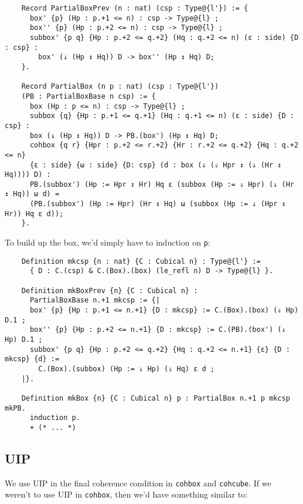 \documentclass[10pt]{art}
\begin{document}
\begin{listing}[H]
  \begin{verbatim}
    Record PartialBoxPrev (n : nat) (csp : Type@{l'}) := {
      box' {p} (Hp : p.+1 <= n) : csp -> Type@{l} ;
      box'' {p} (Hp : p.+2 <= n) : csp -> Type@{l} ;
      subbox' {p q} {Hp : p.+2 <= q.+2} (Hq : q.+2 <= n) (ε : side) {D : csp} :
        box' (↓ (Hp ↕ Hq)) D -> box'' (Hp ↕ Hq) D;
    }.

    Record PartialBox (n p : nat) (csp : Type@{l'})
    (PB : PartialBoxBase n csp) := {
      box (Hp : p <= n) : csp -> Type@{l} ;
      subbox {q} {Hp : p.+1 <= q.+1} (Hq : q.+1 <= n) (ε : side) {D : csp} :
      box (↓ (Hp ↕ Hq)) D -> PB.(box') (Hp ↕ Hq) D;
      cohbox {q r} {Hpr : p.+2 <= r.+2} {Hr : r.+2 <= q.+2} {Hq : q.+2 <= n}
      {ε : side} {ω : side} {D: csp} (d : box (↓ (⇓ Hpr ↕ (↓ (Hr ↕ Hq)))) D) :
      PB.(subbox') (Hp := Hpr ↕ Hr) Hq ε (subbox (Hp := ⇓ Hpr) (↓ (Hr ↕ Hq)) ω d) =
      (PB.(subbox') (Hp := Hpr) (Hr ↕ Hq) ω (subbox (Hp := ↓ (Hpr ↕ Hr)) Hq ε d));
    }.
  \end{verbatim}
\end{listing}

To build up the box, we'd simply have to induction on \texttt{p}:

\begin{listing}[H]
  \begin{verbatim}
    Definition mkcsp {n : nat} {C : Cubical n} : Type@{l'} :=
      { D : C.(csp) & C.(Box).(box) (le_refl n) D -> Type@{l} }.

    Definition mkBoxPrev {n} {C : Cubical n} :
      PartialBoxBase n.+1 mkcsp := {|
      box' {p} {Hp : p.+1 <= n.+1} {D : mkcsp} := C.(Box).(box) (⇓ Hp) D.1 ;
      box'' {p} {Hp : p.+2 <= n.+1} {D : mkcsp} := C.(PB).(box') (⇓ Hp) D.1 ;
      subbox' {p q} {Hp : p.+2 <= q.+2} {Hq : q.+2 <= n.+1} {ε} {D : mkcsp} {d} :=
        C.(Box).(subbox) (Hp := ⇓ Hp) (⇓ Hq) ε d ;
    |}.

    Definition mkBox {n} {C : Cubical n} p : PartialBox n.+1 p mkcsp mkPB.
      induction p.
      + (* ... *)
  \end{verbatim}
\end{listing}

\subsection{UIP}
We use UIP in the final coherence condition in \texttt{cohbox} and \texttt{cohcube}. If we weren't to use UIP in \texttt{cohbox}, then we'd have something similar to:
\end{document}
